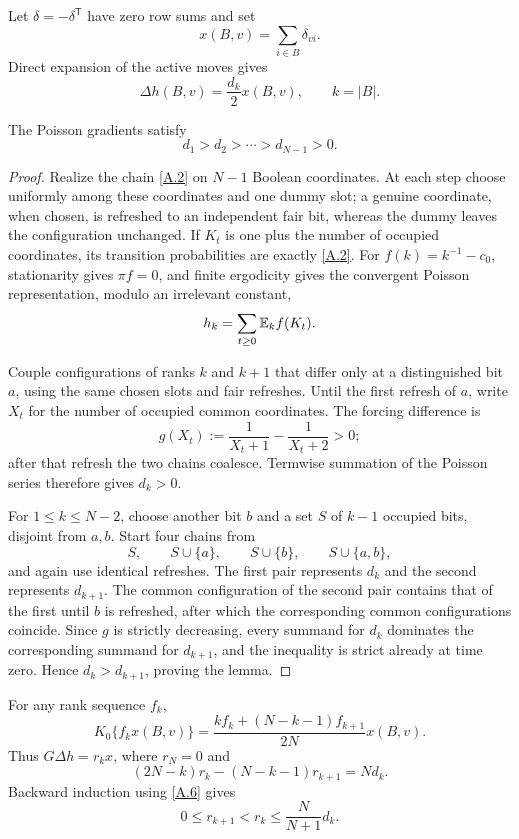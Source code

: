 Let $\delta=-\delta^{\mathsf T}$ have zero row sums and set
\[
 x(B,v)=\sum_{i\in B}\delta_{vi}.                            \tag{A.4}\label{A.4}
\]
Direct expansion of the active moves gives
\[
 \Delta h(B,v)=\frac{d_k}{2}x(B,v),\qquad k=|B|.             \tag{A.5}\label{A.5}
\]
\begin{lemma}\label{lem:rank-gradient}
The Poisson gradients satisfy
\[
 d_1>d_2>\cdots>d_{N-1}>0.                                  \tag{A.6}\label{A.6}
\]
\end{lemma}

\begin{proof}
Realize the chain \eqref{A.2} on $N-1$ Boolean coordinates.  At each step
choose uniformly among these coordinates and one dummy slot; a genuine
coordinate, when chosen, is refreshed to an independent fair bit, whereas
the dummy leaves the configuration unchanged.  If $K_t$ is one plus the
number of occupied coordinates, its transition probabilities are exactly
\eqref{A.2}.  For $f(k)=k^{-1}-c_0$, stationarity gives $\pi f=0$, and finite
ergodicity gives the convergent Poisson representation, modulo an irrelevant
constant,
\[
 h_k=\sum_{t\ge0}\mathbb E_k f(K_t).
\]

Couple configurations of ranks $k$ and $k+1$ that differ only at a
distinguished bit $a$, using the same chosen slots and fair refreshes.  Until
the first refresh of $a$, write $X_t$ for the number of occupied common
coordinates.  The forcing difference is
\[
 g(X_t):=\frac1{X_t+1}-\frac1{X_t+2}>0;
\]
after that refresh the two chains coalesce.  Termwise summation of the
Poisson series therefore gives $d_k>0$.

For $1\le k\le N-2$, choose another bit $b$ and a set $S$ of $k-1$
occupied bits, disjoint from $a,b$.  Start four chains from
\[
 S,\qquad S\cup\{a\},\qquad S\cup\{b\},\qquad S\cup\{a,b\},
\]
and again use identical refreshes.  The first pair represents $d_k$ and the
second represents $d_{k+1}$.  The common configuration of the second pair
contains that of the first until $b$ is refreshed, after which the
corresponding common configurations coincide.  Since $g$ is strictly
decreasing, every summand for $d_k$ dominates the corresponding summand for
$d_{k+1}$, and the inequality is strict already at time zero.  Hence
$d_k>d_{k+1}$, proving the lemma.
\end{proof}

For any rank sequence $f_k$,
\[
 K_0\{f_kx(B,v)\}
 =\frac{kf_k+(N-k-1)f_{k+1}}{2N}x(B,v).                      \tag{A.7}\label{A.7}
\]
Thus $G\Delta h=r_kx$, where $r_N=0$ and
\[
 (2N-k)r_k-(N-k-1)r_{k+1}=Nd_k.                             \tag{A.8}\label{A.8}
\]
Backward induction using \eqref{A.6} gives
\[
 0\le r_{k+1}<r_k\le\frac{N}{N+1}d_k.                       \tag{A.9}\label{A.9}
\]

